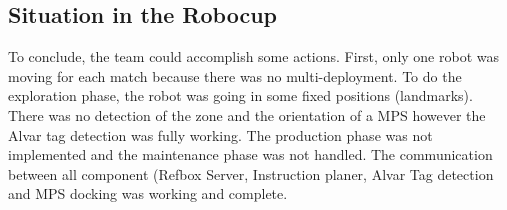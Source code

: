 \subsection{Situation in the Robocup}

To conclude, the team could accomplish some actions. First, only one robot was moving for each match because there was no multi-deployment. To do the exploration phase, the robot was going in some fixed positions (landmarks). There was no detection of the zone and the orientation of a MPS however the Alvar tag detection was fully working. The production phase was not implemented and the maintenance phase was not handled. The communication between all component (Refbox Server, Instruction planer, Alvar Tag detection and MPS docking was working and complete. 